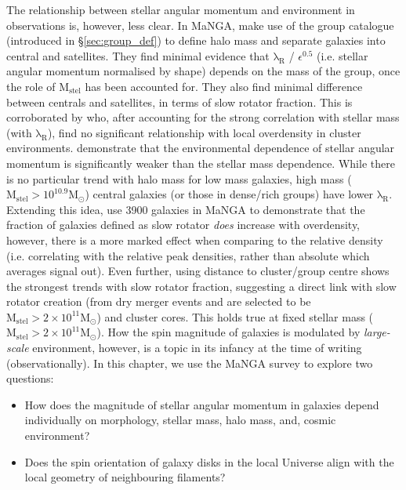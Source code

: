 The relationship between stellar angular momentum and environment in observations is, however, less clear. In MaNGA, \citet{greene2018} make use of the \citet{yang2007} group catalogue (introduced in \S\ref{sec:group_def}) to define halo mass and separate galaxies into central and satellites. They find minimal evidence that $\mathrm{\lambda_R}$ / $\epsilon^{0.5}$ (i.e. stellar angular momentum normalised by shape) depends on the mass of the group, once the role of $\mathrm{M_{stel}}$ has been accounted for. They also find minimal difference between centrals and satellites, in terms of slow rotator fraction. This is corroborated by \citet{brough2017} who, after accounting for the strong correlation with stellar mass (with $\mathrm{\lambda_R}$), find no significant relationship with local overdensity in cluster environments. \citet{wang2020} demonstrate that the environmental dependence of stellar angular momentum is significantly weaker than the stellar mass dependence. While there is no particular trend with halo mass for low mass galaxies, high mass ($\mathrm{M_{stel} > 10^{10.9} M_{\odot}}$) central galaxies (or those in dense/rich groups) have lower $\mathrm{\lambda_R}$. Extending this idea, \citet{graham2019} use 3900 galaxies in MaNGA to demonstrate that the fraction of galaxies defined as slow rotator \textit{does} increase with overdensity, however, there is a more marked effect when comparing to the relative density (i.e. correlating with the relative peak densities, rather than absolute which averages signal out). Even further, using distance to cluster/group centre shows the strongest trends with slow rotator fraction, suggesting a direct link with slow rotator creation (from dry merger events and are selected to be $\mathrm{M_{stel} > 2\times10^{11} M_{\odot}}$) and cluster cores. This holds true at fixed stellar mass ($\mathrm{M_{stel} > 2\times10^{11} M_{\odot}}$). How the spin magnitude of galaxies is modulated by \textit{large-scale} environment, however, is a topic in its infancy at the time of writing (observationally). In this chapter, we use the MaNGA survey to explore two questions:

\begin{itemize}
    \item How does the magnitude of stellar angular momentum in galaxies depend individually on morphology, stellar mass, halo mass, and, cosmic environment?
    \item Does the spin orientation of galaxy disks in the local Universe align with the local geometry of neighbouring filaments?
\end{itemize}

